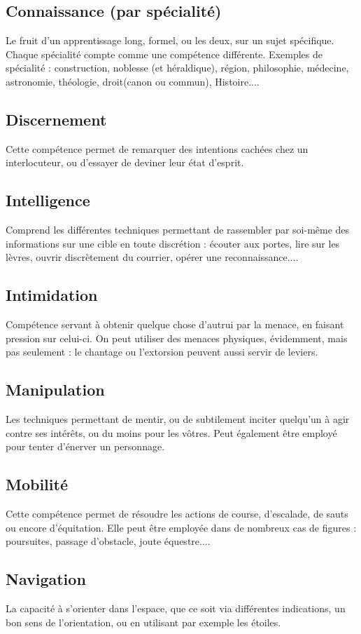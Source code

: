 \documentclass[10pt,a4paper]{book}
\begin{document}
\begin{multicols}{2}
\subsection*{Connaissance (par spécialité)} Le fruit d'un apprentissage long, formel, ou les deux, sur un sujet spécifique. Chaque spécialité compte comme une compétence différente. Exemples de spécialité : construction, noblesse (et héraldique), région, philosophie, médecine, astronomie, théologie, droit(canon ou commun), Histoire....
\subsection*{Discernement}Cette compétence permet de remarquer des intentions cachées chez un interlocuteur, ou d'essayer de deviner leur état d'esprit. 
\subsection*{Intelligence}Comprend les différentes techniques permettant de rassembler par soi-même des informations sur une cible en toute discrétion : écouter aux portes, lire sur les lèvres, ouvrir discrètement du courrier, opérer une reconnaissance....
\subsection*{Intimidation}Compétence servant à obtenir quelque chose d'autrui par la menace, en faisant pression sur celui-ci. On peut utiliser des menaces physiques, évidemment, mais pas seulement : le chantage ou l'extorsion peuvent aussi servir de leviers.
\subsection*{Manipulation}Les techniques permettant de mentir, ou de subtilement inciter quelqu'un à agir contre ses intérêts, ou du moins pour les vôtres. Peut également être employé pour tenter d'énerver un personnage.
\subsection*{Mobilité} Cette compétence permet de résoudre les actions de course, d'escalade, de sauts ou encore d'équitation. Elle peut être employée dans de nombreux cas de figures : poursuites, passage d'obstacle, joute équestre.... 
\subsection*{Navigation} La capacité à s'orienter dans l'espace, que ce soit via différentes indications, un bon sens de l'orientation, ou en utilisant par exemple les étoiles.

\end{multicols}
\end{document}
